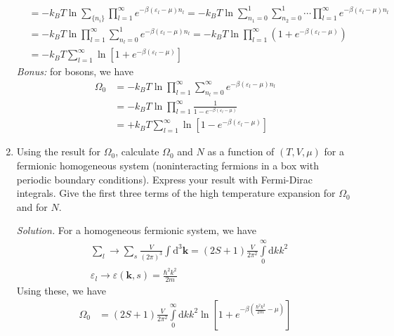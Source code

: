 \documentclass[11pt, a4paper]{article}
\newcommand{\dd}{\mathrm{d}}
\begin{document}
\begin{enumerate}
\begin{align*}
        &= -k_BT \ln \sum\limits_{\{n_i\}}\prod\limits_{l=1}^{\infty}e^{-\beta(\varepsilon_l-\mu) n_l}
        = -k_BT \ln \sum\limits_{n_1=0}^1\sum\limits_{n_2=0}^1\cdots \prod\limits_{l=1}^{\infty}e^{-\beta(\varepsilon_l-\mu) n_l}\\
        &= -k_BT \ln \prod\limits_{l=1}^{\infty}\sum\limits_{n_l=0}^1 e^{-\beta(\varepsilon_l-\mu) n_l}
        = -k_BT \ln \prod\limits_{l=1}^{\infty}\left(1+e^{-\beta(\varepsilon_l-\mu)}\right)\\
        &= -k_BT \sum\limits_{l=1}^{\infty}\ln\left[1+e^{-\beta(\varepsilon_l-\mu)}\right]
    \end{align*}
    \textit{Bonus:} for bosons, we have
    \begin{align*}
        \Omega_0 &= -k_BT \ln \prod\limits_{l=1}^{\infty}\sum\limits_{n_l=0}^{\infty} e^{-\beta(\varepsilon_l-\mu) n_l}\\
        &= -k_BT \ln \prod\limits_{l=1}^{\infty} \frac{1}{1-e^{-\beta(\varepsilon_l-\mu)}}\\
        &= +k_BT \sum \limits_{l=1}^{\infty} \ln \left[1-e^{-\beta(\varepsilon_l-\mu)}\right]
    \end{align*}
    \item Using the result for $\Omega_0$, calculate $\Omega_0$ and $N$ as a function of $(T,V,\mu)$
    for a fermionic homogeneous system (noninteracting fermions in a box with periodic boundary
    conditions). Express your result with Fermi-Dirac integrals. Give the first three terms of the
    high temperature expansion for $\Omega_0$ and for $N$.
    \par\textit{Solution.}
    For a homogeneous fermionic system, we have
    \begin{align*}
        &\sum\limits_l \longrightarrow \sum\limits_s\frac{V}{(2\pi)^3}\int \dd^3\mathbf{k}
        = (2S+1)\frac{V}{2\pi^2}\int\limits_{0}^{\infty} \dd k k^2 \\
        &\varepsilon_l \longrightarrow \varepsilon(\mathbf{k},s) = \frac{\hbar^2k^2}{2m}
    \end{align*}
    Using these, we have
    \begin{align*}
        \Omega_0 &= (2S+1)\frac{V}{2\pi^2}\int\limits_{0}^{\infty} \dd k k^2 \ln\left[1+e^{-\beta\left(\frac{\hbar^2k^2}{2m} - \mu\right)}\right]

\end{align*}
\end{enumerate}
\end{document}
